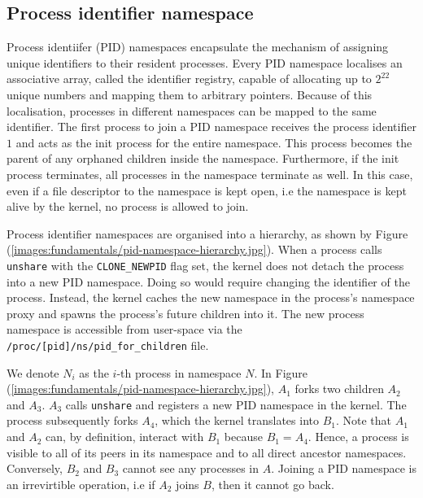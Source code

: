 \subsection{Process identifier namespace}
\label{sections:fundamentals/namespaces/process}
Process identiifer (PID) namespaces encapsulate the mechanism of assigning 
unique identifiers to their resident processes. Every PID namespace localises an associative 
array, called the identifier registry, capable of allocating up to $2^{22}$ unique numbers and mapping them to arbitrary 
pointers. Because of this localisation, processes in different namespaces can be mapped to the 
same identifier. The first process to join a PID namespace receives the process identifier $1$ 
and acts as the init process for the entire namespace. This process becomes the parent of 
any orphaned children inside the namespace. Furthermore, if the init process terminates, all processes 
in the namespace terminate as well. In this case, even if a file descriptor to the namespace is kept open, 
i.e the namespace is kept alive by the kernel, no process is allowed to join.  

Process identifier namespaces are organised into a hierarchy, 
as shown by Figure (\ref{images:fundamentals/pid-namespace-hierarchy.jpg}).
When a process calls \verb|unshare| with the \verb|CLONE_NEWPID| flag set, 
the kernel does not detach the process into a new PID namespace. Doing so would require 
changing the identifier of the process.
Instead, the kernel caches the new namespace in the process's namespace proxy and 
spawns the process's future children into it. The new process namespace is accessible from 
user-space via the \verb|/proc/[pid]/ns/pid_for_children| file. 

We denote $N_{i}$ as the $i$-th process in namespace $N$. 
In Figure (\ref{images:fundamentals/pid-namespace-hierarchy.jpg}),
$A_{1}$ forks two children $A_{2}$ and $A_{3}$. 
$A_{3}$ calls \verb|unshare| and registers a new PID namespace in the kernel. The process 
subsequently forks $A_{4}$, which the kernel translates into $B_{1}$.
Note that $A_{1}$ and $A_{2}$ can, by definition, interact with $B_{1}$ because $B_{1} = A_{4}$.  
Hence, a process is visible to all of its peers in its namespace and to all direct ancestor
namespaces. Conversely, $B_{2}$ and $B_{3}$ cannot see any processes in $A$. 
Joining a PID namespace is an irrevirtible operation, i.e if $A_{2}$ joins $B$,
then it cannot go back.

